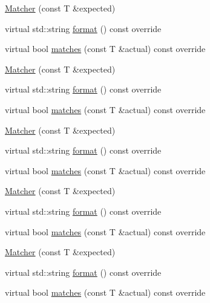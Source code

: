 \begin{DoxyCompactItemize}
\item 
\mbox{\hyperlink{structfakeit_1_1internal_1_1EqMatcherCreator_1_1Matcher_a5187a06117250944e20993b6b5d9c34b}{Matcher}} (const T \&expected)
\item 
virtual std\+::string \mbox{\hyperlink{structfakeit_1_1internal_1_1EqMatcherCreator_1_1Matcher_a6f34118ff7fea46a8d934cb90885c42f}{format}} () const override
\item 
virtual bool \mbox{\hyperlink{structfakeit_1_1internal_1_1EqMatcherCreator_1_1Matcher_a777fef5dafff87f2e8cb7a0201a9bc78}{matches}} (const T \&actual) const override
\item 
\mbox{\hyperlink{structfakeit_1_1internal_1_1EqMatcherCreator_1_1Matcher_a5187a06117250944e20993b6b5d9c34b}{Matcher}} (const T \&expected)
\item 
virtual std\+::string \mbox{\hyperlink{structfakeit_1_1internal_1_1EqMatcherCreator_1_1Matcher_a6f34118ff7fea46a8d934cb90885c42f}{format}} () const override
\item 
virtual bool \mbox{\hyperlink{structfakeit_1_1internal_1_1EqMatcherCreator_1_1Matcher_a777fef5dafff87f2e8cb7a0201a9bc78}{matches}} (const T \&actual) const override
\item 
\mbox{\hyperlink{structfakeit_1_1internal_1_1EqMatcherCreator_1_1Matcher_a5187a06117250944e20993b6b5d9c34b}{Matcher}} (const T \&expected)
\item 
virtual std\+::string \mbox{\hyperlink{structfakeit_1_1internal_1_1EqMatcherCreator_1_1Matcher_a6f34118ff7fea46a8d934cb90885c42f}{format}} () const override
\item 
virtual bool \mbox{\hyperlink{structfakeit_1_1internal_1_1EqMatcherCreator_1_1Matcher_a777fef5dafff87f2e8cb7a0201a9bc78}{matches}} (const T \&actual) const override
\item 
\mbox{\hyperlink{structfakeit_1_1internal_1_1EqMatcherCreator_1_1Matcher_a5187a06117250944e20993b6b5d9c34b}{Matcher}} (const T \&expected)
\item 
virtual std\+::string \mbox{\hyperlink{structfakeit_1_1internal_1_1EqMatcherCreator_1_1Matcher_a6f34118ff7fea46a8d934cb90885c42f}{format}} () const override
\item 
virtual bool \mbox{\hyperlink{structfakeit_1_1internal_1_1EqMatcherCreator_1_1Matcher_a777fef5dafff87f2e8cb7a0201a9bc78}{matches}} (const T \&actual) const override
\item 
\mbox{\hyperlink{structfakeit_1_1internal_1_1EqMatcherCreator_1_1Matcher_a5187a06117250944e20993b6b5d9c34b}{Matcher}} (const T \&expected)
\item 
virtual std\+::string \mbox{\hyperlink{structfakeit_1_1internal_1_1EqMatcherCreator_1_1Matcher_a6f34118ff7fea46a8d934cb90885c42f}{format}} () const override
\item 
virtual bool \mbox{\hyperlink{structfakeit_1_1internal_1_1EqMatcherCreator_1_1Matcher_a777fef5dafff87f2e8cb7a0201a9bc78}{matches}} (const T \&actual) const override
\end{DoxyCompactItemize}
